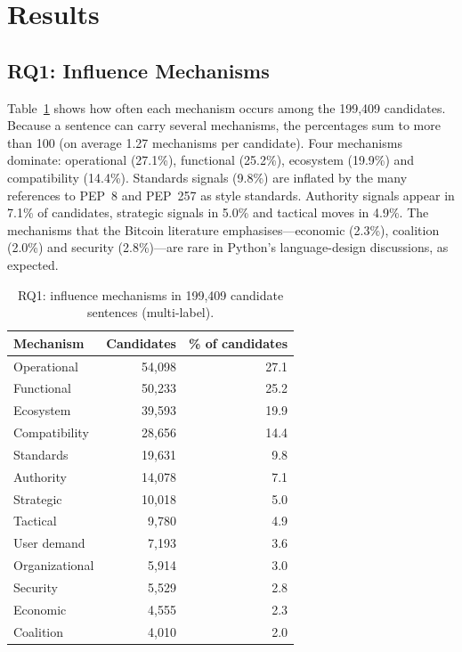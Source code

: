 \documentclass[sigconf,screen]{acmart}
\begin{document}
\section{Results}
\label{sec:results}

\subsection{RQ1: Influence Mechanisms}

Table~\ref{tab:rq1} shows how often each mechanism occurs among the 199,409 candidates. Because a sentence can carry several mechanisms, the percentages sum to more than 100 (on average 1.27 mechanisms per candidate). Four mechanisms dominate: operational (27.1\%), functional (25.2\%), ecosystem (19.9\%) and compatibility (14.4\%). Standards signals (9.8\%) are inflated by the many references to PEP~8 and PEP~257 as style standards. Authority signals appear in 7.1\% of candidates, strategic signals in 5.0\% and tactical moves in 4.9\%. The mechanisms that the Bitcoin literature emphasises---economic (2.3\%), coalition (2.0\%) and security (2.8\%)---are rare in Python's language-design discussions, as expected.

\begin{table}[t]
\caption{RQ1: influence mechanisms in 199,409 candidate sentences (multi-label).}
\label{tab:rq1}
\begin{tabular}{lrr}
\toprule
Mechanism & Candidates & \% of candidates \\
\midrule
Operational & 54,098 & 27.1 \\
Functional & 50,233 & 25.2 \\
Ecosystem & 39,593 & 19.9 \\
Compatibility & 28,656 & 14.4 \\
Standards & 19,631 & 9.8 \\
Authority & 14,078 & 7.1 \\
Strategic & 10,018 & 5.0 \\
Tactical & 9,780 & 4.9 \\
User demand & 7,193 & 3.6 \\
Organizational & 5,914 & 3.0 \\
Security & 5,529 & 2.8 \\
Economic & 4,555 & 2.3 \\
Coalition & 4,010 & 2.0 \\
\bottomrule
\end{tabular}
\end{table}
\end{document}
